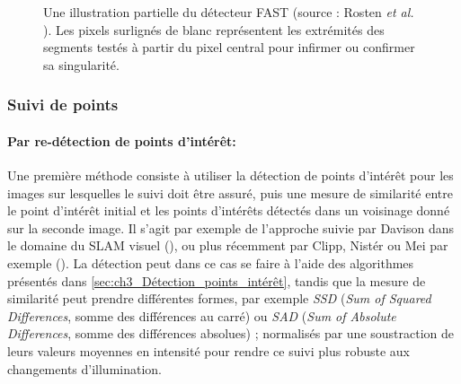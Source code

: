 \begin{figure}
	\caption{Une illustration partielle du détecteur FAST (source : Rosten\textit{ et al.} \cite{Rosten}). Les pixels surlignés de blanc représentent les extrémités des segments testés à partir du pixel central pour infirmer ou confirmer sa singularité.}
	\label{fig:ch3_FAST_illustration}
\end{figure}

\subsubsection{Suivi de points} \label{sec:ch3_suivi_de_points}
\paragraph{Par re-détection de points d'intérêt:\\}
Une première méthode consiste à utiliser la détection de points d'intérêt pour les images sur lesquelles le suivi doit être assuré, puis une mesure de similarité entre le point d'intérêt initial et les points d'intérêts détectés dans un voisinage donné sur la seconde image. Il s'agit par exemple de l'approche suivie par Davison dans le domaine du SLAM visuel (\cite{Davison2003}), ou plus récemment par Clipp, Nistér ou Mei par exemple (\cite{Clipp, Nister2006, Mei2010}). La détection peut dans ce cas se faire à l'aide des algorithmes présentés dans \ref{sec:ch3_Détection_points_intérêt}, tandis que la mesure de similarité peut prendre différentes formes, par exemple \textit{SSD} (\emph{Sum of Squared Differences}, somme des différences au carré) ou \textit{SAD} (\emph{Sum of Absolute Differences}, somme des différences absolues) ; normalisés par une soustraction de leurs valeurs moyennes en intensité pour rendre ce suivi plus robuste aux changements d'illumination.


